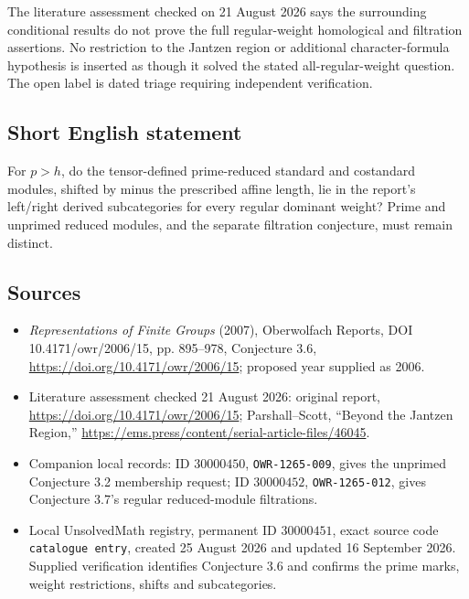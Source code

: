 \documentclass[11pt]{article}
\begin{document}
The literature assessment checked on 21 August 2026 says the surrounding conditional results do not prove the full regular-weight homological and filtration assertions. No restriction to the Jantzen region or additional character-formula hypothesis is inserted as though it solved the stated all-regular-weight question. The open label is dated triage requiring independent verification.
\subsection{Short English statement}
For $p>h$, do the tensor-defined prime-reduced standard and costandard modules, shifted by minus the prescribed affine length, lie in the report's left/right derived subcategories for every regular dominant weight? Prime and unprimed reduced modules, and the separate filtration conjecture, must remain distinct.
\subsection{Sources}
\begin{itemize}
\item \emph{Representations of Finite Groups} (2007), Oberwolfach Reports, DOI 10.4171/owr/2006/15, pp. 895--978, Conjecture 3.6, \url{https://doi.org/10.4171/owr/2006/15}; proposed year supplied as 2006.
\item Literature assessment checked 21 August 2026: original report, \url{https://doi.org/10.4171/owr/2006/15}; Parshall--Scott, ``Beyond the Jantzen Region,'' \url{https://ems.press/content/serial-article-files/46045}.
\item Companion local records: ID $30000450$, \texttt{OWR-1265-009}, gives the unprimed Conjecture 3.2 membership request; ID $30000452$, \texttt{OWR-1265-012}, gives Conjecture 3.7's regular reduced-module filtrations.
\item Local UnsolvedMath registry, permanent ID $30000451$, exact source code \texttt{catalogue entry}, created 25 August 2026 and updated 16 September 2026. Supplied verification identifies Conjecture 3.6 and confirms the prime marks, weight restrictions, shifts and subcategories.
\end{itemize}
\end{document}
